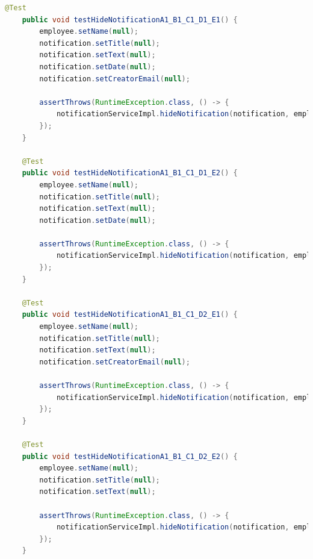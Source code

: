 \begin{lstlisting}[language=java]
    @Test
    public void testHideNotificationA1_B1_C1_D1_E1() {
        employee.setName(null);
        notification.setTitle(null);
        notification.setText(null);
        notification.setDate(null);
        notification.setCreatorEmail(null);

        assertThrows(RuntimeException.class, () -> {
            notificationServiceImpl.hideNotification(notification, employee);
        });
    }

    @Test
    public void testHideNotificationA1_B1_C1_D1_E2() {
        employee.setName(null);
        notification.setTitle(null);
        notification.setText(null);
        notification.setDate(null);

        assertThrows(RuntimeException.class, () -> {
            notificationServiceImpl.hideNotification(notification, employee);
        });
    }

    @Test
    public void testHideNotificationA1_B1_C1_D2_E1() {
        employee.setName(null);
        notification.setTitle(null);
        notification.setText(null);
        notification.setCreatorEmail(null);

        assertThrows(RuntimeException.class, () -> {
            notificationServiceImpl.hideNotification(notification, employee);
        });
    }

    @Test
    public void testHideNotificationA1_B1_C1_D2_E2() {
        employee.setName(null);
        notification.setTitle(null);
        notification.setText(null);

        assertThrows(RuntimeException.class, () -> {
            notificationServiceImpl.hideNotification(notification, employee);
        });
    }
\end{lstlisting}
\newpage
